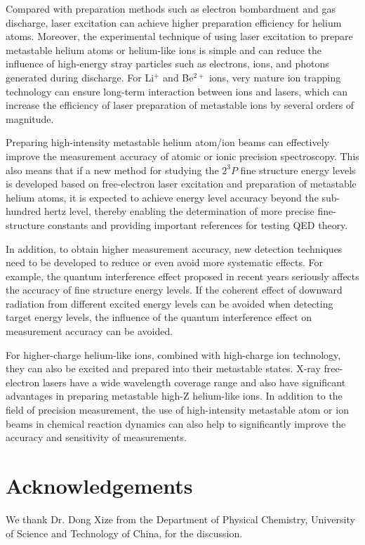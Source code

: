 \documentclass[12pt,a4paper]{article}
\begin{document}
Compared with preparation methods such as electron bombardment and gas discharge, laser excitation can achieve higher preparation efficiency for helium atoms. Moreover, the experimental technique of using laser excitation to prepare metastable helium atoms or helium-like ions is simple and can reduce the influence of high-energy stray particles such as electrons, ions, and photons generated during discharge. For Li$^{+}$ and Be$^{2+}$ ions, very mature ion trapping technology can ensure long-term interaction between ions and lasers, which can increase the efficiency of laser preparation of metastable ions by several orders of magnitude.

Preparing high-intensity metastable helium atom/ion beams can effectively improve the measurement accuracy of atomic or ionic precision spectroscopy. This also means that if a new method for studying the $2^3P$ fine structure energy levels is developed based on free-electron laser excitation and preparation of metastable helium atoms, it is expected to achieve energy level accuracy beyond the sub-hundred hertz level, thereby enabling the determination of more precise fine-structure constants and providing important references for testing QED theory.

In addition, to obtain higher measurement accuracy, new detection techniques need to be developed to reduce or even avoid more systematic effects. For example, the quantum interference effect proposed in recent years seriously affects the accuracy of fine structure energy levels. If the coherent effect of downward radiation from different excited energy levels can be avoided when detecting target energy levels, the influence of the quantum interference effect on measurement accuracy can be avoided.

For higher-charge helium-like ions, combined with high-charge ion technology, they can also be excited and prepared into their metastable states. X-ray free-electron lasers have a wide wavelength coverage range and also have significant advantages in preparing metastable high-Z helium-like ions. In addition to the field of precision measurement, the use of high-intensity metastable atom or ion beams in chemical reaction dynamics can also help to significantly improve the accuracy and sensitivity of measurements.

\section*{Acknowledgements}
We thank Dr. Dong Xize from the Department of Physical Chemistry, University of Science and Technology of China, for the discussion.
\end{document}
